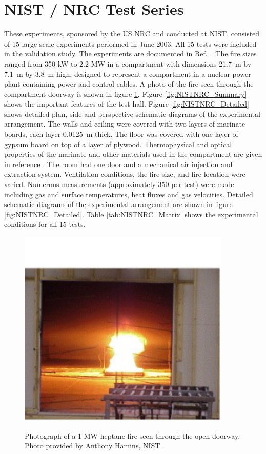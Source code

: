 \section{NIST / NRC Test Series}

These experiments, sponsored by the US NRC and conducted at NIST, consisted of 15 large-scale experiments performed in June 2003. All 15 tests were included in the validation study. The experiments are documented in Ref.~\cite{Hamins:2005}. The fire sizes ranged from 350 kW to 2.2 MW in a compartment with dimensions 21.7~m by 7.1~m by 3.8~m high, designed to represent a compartment in a nuclear power plant containing power and control cables. A photo of the fire seen through the compartment doorway is shown in figure \ref{fig:NISTNRC_1MW_fire}. Figure \ref{fig:NISTNRC_Summary} shows the important features of the test hall. Figure \ref{fig:NISTNRC_Detailed} shows detailed plan, side and perspective schematic diagrams of the experimental arrangement. The walls and ceiling were covered with two layers of marinate boards, each layer 0.0125~m thick. The floor was covered with one layer of gypsum board on top of a layer of plywood. Thermophysical and optical properties of the marinate and other materials used in the compartment are given in reference \cite{Hamins:2005}. The room had one door and a mechanical air injection and extraction system. Ventilation conditions, the fire size, and fire location were varied. Numerous measurements (approximately 350 per test) were made including gas and surface temperatures, heat fluxes and gas velocities. Detailed schematic diagrams of the experimental arrangement are shown in figure \ref{fig:NISTNRC_Detailed}. Table \ref{tab:NISTNRC_Matrix} shows the experimental conditions for all 15 tests.

\begin{figure}[\figoptions{t}]
\begin{center}
\includegraphics[width=4.0in]{FIGURES/NIST_NRC/NISTNRC_1MW_fire}\\
\end{center}
\caption{Photograph of a 1 MW heptane fire seen through the open doorway. Photo provided by Anthony Hamins, NIST.}
 \label{fig:NISTNRC_1MW_fire}
\end{figure}

